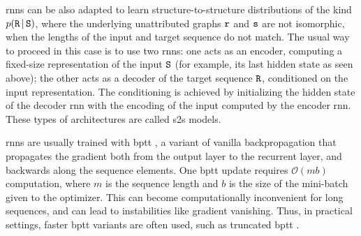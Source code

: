 \glspl{rnn} can be also adapted to learn structure-to-structure distributions of the kind $p(\GraphU{R} \given \GraphU{S})$, where the underlying unattributed graphs $\mathtt{r}$ and $\mathtt{s}$ are not isomorphic, \ie when the lengths of the input and target sequence do not match. The usual way to proceed in this case is to use two \glspl{rnn}: one acts as an encoder, computing a fixed-size representation of the input $\GraphU{S}$ (for example, its last hidden state as seen above); the other acts as a decoder of the target sequence $\GraphU{R}$, conditioned on the input representation. The conditioning is achieved by initializing the hidden state of the decoder \gls{rnn} with the encoding of the input computed by the encoder \gls{rnn}. These types of architectures are called \gls{s2s} models.

\glspl{rnn} are usually trained with \gls{bptt} \citep{werbos1988backpropthroughtime}, a variant of vanilla backpropagation that propagates the gradient both from the output layer to the recurrent layer, and backwards along the sequence elements. One \gls{bptt} update requires $\mathcal{O}(mb)$ computation, where $m$ is the sequence length and $b$ is the size of the mini-batch given to the optimizer. This can become computationally inconvenient for long sequences, and can lead to instabilities like gradient vanishing. Thus, in practical settings, faster \gls{bptt} variants are often used, such as truncated \gls{bptt} \citep{jaeger2002truncatedbptt}.

